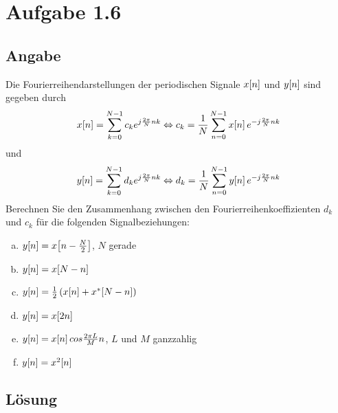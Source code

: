 \section*{Aufgabe 1.6}
\subsection*{Angabe}
Die Fourierreihendarstellungen der periodischen Signale $x\negthinspace\left[n\right]$ und $y\negthinspace\left[n\right]$ sind gegeben durch
\[
	x\negthinspace\left[n\right]=\sum_{k=0}^{N-1}c_ke^{j\frac{2\pi}{N}nk}\Leftrightarrow c_k=\frac{1}{N}\sum_{n=0}^{N-1}x\negthinspace\left[n\right]e^{-j\frac{2\pi}{N}nk}
\]
und
\[
	y\negthinspace\left[n\right]=\sum_{k=0}^{N-1}d_ke^{j\frac{2\pi}{N}nk}\Leftrightarrow d_k=\frac{1}{N}\sum_{n=0}^{N-1}y\negthinspace\left[n\right]e^{-j\frac{2\pi}{N}nk}
\]
Berechnen Sie den Zusammenhang zwischen den Fourierreihenkoeffizienten $d_k$ und $c_k$ für die folgenden Signalbeziehungen:
\begin{enumerate}[a)]
	\item $y\negthinspace\left[n\right]=x\negthinspace\left[n-\frac{N}{2}\right]$,	$N$ gerade
	\item $y\negthinspace\left[n\right]=x\negthinspace\left[N-n\right]$
	\item $y\negthinspace\left[n\right]=\frac{1}{2}\left(x\negthinspace\left[n\right]+x^*\negthinspace\left[N-n\right]\right)$
	\item $y\negthinspace\left[n\right]=x\negthinspace\left[2n\right]$
	\item $y\negthinspace\left[n\right]=x\negthinspace\left[n\right]cos \frac{2\pi L}{M}n$,	$L$ und $M$ ganzzahlig
	\item $y\negthinspace\left[n\right]=x^2\negthinspace\left[n\right]$
\end{enumerate}
\subsection*{Lösung}